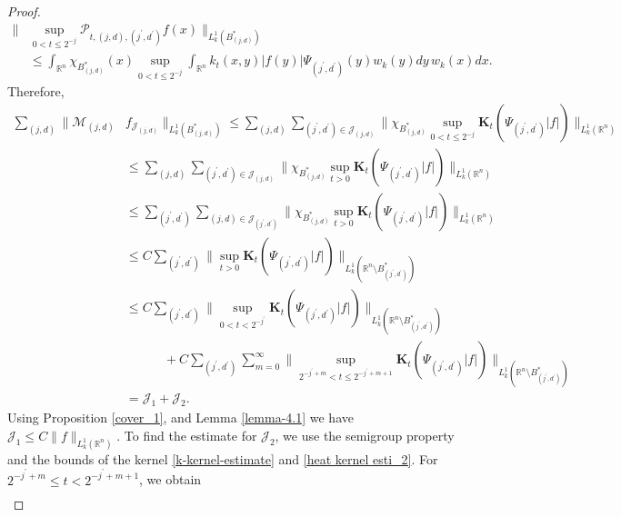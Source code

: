 \documentclass[11pt, reqno]{amsproc}
\theoremstyle{definition}
\theoremstyle{remark}
\numberwithin{equation}{section}
\begin{document}
\begin{proof}
\begin{align*}
     \Bigg\|&\sup\limits_{0<t\leq 2^{-j}}  \mathcal{P}_{t,(j,d),(j^\prime, d^\prime)}f(x)\Bigg\|_{L_k^1\left( B_{(j,d)}^* \right)}\\ 
     &\leq \int_{\mathbb{R}^n} \chi_{B_{(j,d)}^* } (x)\sup\limits_{0<t\leq 2^{-j}}  \int_{\mathbb{R}^n} k_t(x,y)|f(y)| \Psi_{(j^\prime,d^\prime)}(y)w_k(y)dy\,w_k(x)dx.
\end{align*} Therefore, 
\begin{align*}
\sum_{(j,d)}\Big\|\mathcal{M}_{(j,d)}&f_{\mathcal{J}_{(j,d)}}\Big\|_{L_k^1\left(B_{(j,d)}^*\right)} \leq 
\sum_{(j,d)} \sum_{(j^\prime,d^\prime) \in  \mathcal{J}_{(j,d)}} \Big \| \chi_{B_{(j,d)}^* } \sup_{0<t\leq 2^{-j}} \mathbf{K}_t\left(\Psi_{(j^\prime,d^\prime)}|f|\right)\Big\|_{L_k^1(\mathbb{R}^n)}\\
& \leq \sum_{(j,d)} \sum_{(j^\prime,d^\prime) \in  \mathcal{J}_{(j,d)}} \Big \| \chi_{B_{(j,d)}^* } \sup_{t>0} \mathbf{K}_t\left(\Psi_{(j^\prime,d^\prime)}|f|\right)\Big\|_{L_k^1(\mathbb{R}^n)}\\
& \leq \sum_{(j^\prime,d^\prime)} \sum_{(j,d) \in \mathcal{J}_{(j^\prime,d^\prime)} } \Big \| \chi_{B_{(j,d)}^* } \sup_{t>0} \mathbf{K}_t\left(\Psi_{(j^\prime,d^\prime)}|f|\right)\Big\|_{L_k^1(\mathbb{R}^n)}\\
& \leq C \sum_{(j^\prime,d^\prime)} \Big \|  \sup_{t>0} \mathbf{K}_t\left(\Psi_{(j^\prime,d^\prime)}|f|\right)\Big\|_{L_k^1\left(\mathbb{R}^n \setminus B_{(j^\prime,d^\prime)}^*\right )}\\
& \leq C \sum_{(j^\prime,d^\prime)} \Big \|  \sup_{0<t< 2^{-j^\prime}} \mathbf{K}_t\left(\Psi_{(j^\prime,d^\prime)}|f|\right)\Big\|_{L_k^1\left(\mathbb{R}^n \setminus B_{(j^\prime,d^\prime)}^*\right )} \\
& \quad \quad \quad + C \sum_{(j^\prime,d^\prime)} \sum_{m=0} ^ \infty \Big \|  \sup_{2^{-j^\prime+m}<t\leq 2^{-j^\prime+m+1}} \mathbf{K}_t\left(\Psi_{(j^\prime,d^\prime)}|f|\right)\Big\|_{L_k^1\left(\mathbb{R}^n \setminus B_{(j^\prime,d^\prime)}^*\right )} \\
& = \mathcal{J}_1+ \mathcal{J}_2.
\end{align*}
Using Proposition \ref{cover_1}, and Lemma \ref{lemma-4.1} we have $ \mathcal{J}_1 \leq C\|f\|_{L_k^1(\mathbb{R}^n)}$.  To find the estimate for $\mathcal{J}_2$, we use the semigroup property and the bounds of the kernel \eqref{k-kernel-estimate} and \eqref{heat kernel esti_2}. For $2^{-j^\prime+m} \leq t < 2^{-j^\prime+m+1}$, we obtain 
\begin{align*}

\end{align*}
\end{proof}
\end{document}
